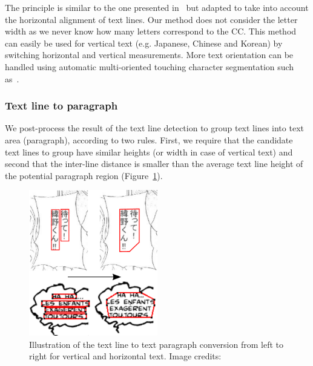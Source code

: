 The principle is similar to the one presented in~\cite{Clavelli09} but adapted to take into account the horizontal alignment of text lines.
Our method does not consider the letter width as we never know how many letters correspond to the CC.
This method can easily be used for vertical text (e.g. Japanese, Chinese and Korean) by switching horizontal and vertical measurements.
More text orientation can be handled using automatic multi-oriented touching character segmentation such as~\cite{Roy2009Multi}.








\subsubsection{Text line to paragraph} %
\label{par:text_line_grouping}

We post-process the result of the text line detection to group text lines into text area (paragraph), according to two rules.
First, we require that the candidate text lines to group have similar heights (or width in case of vertical text) and second that the inter-line distance is smaller than the average text line height of the potential paragraph region (Figure~\ref{fig:se:line_to_paragraphs}).

	\begin{figure}[h!]	%
	  \centering
		\includegraphics[trim= 0px 0px 0px 0px, clip, width=0.5\textwidth]{line_to_paragraphs.pdf}
		\caption[Text line to text paragraph conversion illustration]{Illustration of the text line to text paragraph conversion from left to right for vertical and horizontal text. Image credits:~\cite{Inoue08,Bubble09}}
		\label{fig:se:line_to_paragraphs}
	\end{figure}

